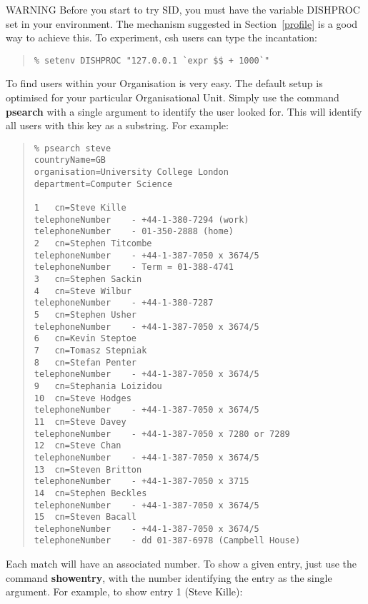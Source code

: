 \begin{describe}
\item[WARNING] Before you start to try SID, you must have the variable
DISHPROC set in your environment.  The mechanism suggested in
Section~\ref{profile} is a good way to achieve this.  To experiment,
csh users can type the incantation:
\end{describe}
\begin{quote}\begin{verbatim}
% setenv DISHPROC "127.0.0.1 `expr $$ + 1000`"
\end{verbatim}\end{quote}


To find users within your Organisation is very easy.  
The default setup is optimised for
your particular Organisational Unit.  Simply use the command {\bf psearch}
with a single argument to identify the user looked for.  This will identify
all users with this key as a substring.  For example:

\begin{quote}\small\begin{verbatim}
% psearch steve
countryName=GB
organisation=University College London
department=Computer Science

1   cn=Steve Kille
telephoneNumber    - +44-1-380-7294 (work)
telephoneNumber    - 01-350-2888 (home)
2   cn=Stephen Titcombe
telephoneNumber    - +44-1-387-7050 x 3674/5 
telephoneNumber    - Term = 01-388-4741
3   cn=Stephen Sackin
4   cn=Steve Wilbur
telephoneNumber    - +44-1-380-7287
5   cn=Stephen Usher
telephoneNumber    - +44-1-387-7050 x 3674/5 
6   cn=Kevin Steptoe
7   cn=Tomasz Stepniak
8   cn=Stefan Penter
telephoneNumber    - +44-1-387-7050 x 3674/5 
9   cn=Stephania Loizidou
10  cn=Steve Hodges
telephoneNumber    - +44-1-387-7050 x 3674/5 
11  cn=Steve Davey
telephoneNumber    - +44-1-387-7050 x 7280 or 7289
12  cn=Steve Chan
telephoneNumber    - +44-1-387-7050 x 3674/5 
13  cn=Steven Britton
telephoneNumber    - +44-1-387-7050 x 3715
14  cn=Stephen Beckles
telephoneNumber    - +44-1-387-7050 x 3674/5 
15  cn=Steven Bacall
telephoneNumber    - +44-1-387-7050 x 3674/5 
telephoneNumber    - dd 01-387-6978 (Campbell House)
\end{verbatim}\end{quote}


Each match will have an associated number.  To show a given entry, just use
the command {\bf showentry}, with the number identifying the entry as the
single argument.  For example, to show entry 1 (Steve Kille):

